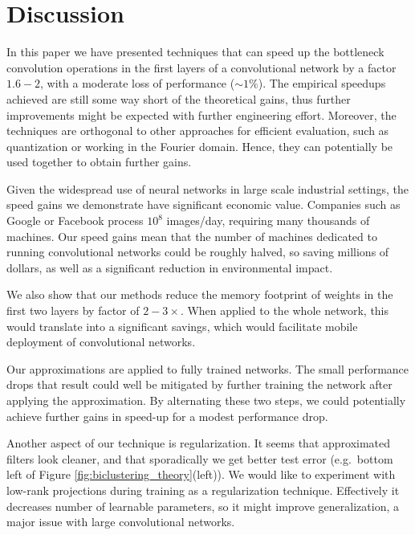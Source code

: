 
\section{Discussion}

In this paper we have presented techniques that can speed up the
bottleneck convolution operations in the first layers of a convolutional network by a factor $1.6-2$, with a
moderate loss of performance ($\sim1\%$). The empirical speedups
achieved are still some way short of the theoretical gains, thus
further improvements might be expected with further engineering effort. 
Moreover, the techniques are orthogonal
to other approaches for efficient evaluation, such as quantization or
working in the Fourier domain. Hence, they can potentially be used
together to obtain further gains. 

Given the widespread use of neural networks in large scale industrial
settings, the speed gains we demonstrate have significant economic
value. Companies such as Google or Facebook process $10^8$ images/day,
requiring many thousands of machines. Our speed gains mean that the
number of machines dedicated to running convolutional networks could be roughly halved, so saving millions of
dollars, as well as a significant reduction in environmental impact.


We also show that our methods reduce the memory footprint of weights
in the first two layers by factor of $2-3\times$. When applied to the whole network,
this would translate into a significant savings, which would facilitate mobile deployment
of convolutional networks.

Our approximations are applied to fully trained networks. The
small performance drops that result could well be mitigated by further
training the network after applying the approximation. By alternating
these two steps, we could potentially achieve further gains in
speed-up for a modest performance drop.


Another aspect of our technique is regularization. It seems that
approximated filters look cleaner, and that sporadically we get better
test error (e.g.~bottom left of Figure
\ref{fig:biclustering_theory}(left)). We would like to experiment with
low-rank projections during training as a regularization
technique. Effectively it decreases number of learnable parameters,
so it might improve generalization, a major issue with large convolutional networks.
  




